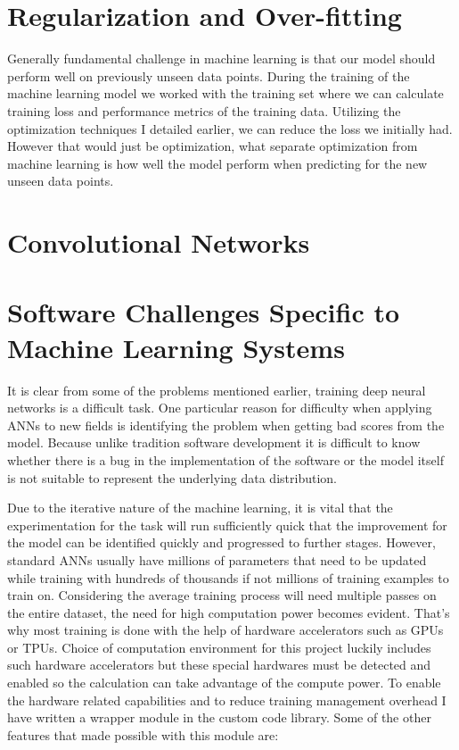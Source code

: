 \section{Regularization and Over-fitting} \label{sec:regularization}
Generally fundamental challenge in machine learning is that our model should perform well on previously unseen data points.
During the training of the machine learning model we worked with the training set where we can calculate training loss and performance metrics of the training data. 
Utilizing the optimization techniques I detailed earlier, we can reduce the loss we initially had. 
However that would just be optimization, what separate optimization from machine learning is how well the model perform when predicting for the new unseen data points. 


\section{Convolutional Networks} \label{sec:convnets}

\section{Software Challenges Specific to 
Machine Learning Systems} \label{sec:engchallenge}
It is clear from some of the problems mentioned earlier, training deep neural networks is a difficult task. 
One particular reason for difficulty when applying ANNs to new fields is identifying the problem when getting bad scores from the model. 
Because unlike tradition software development it is difficult to know whether there is a bug in the implementation of the software or the model itself is not suitable to represent the underlying data distribution.

Due to the iterative nature of the machine learning, it is vital that the experimentation for the task will run sufficiently quick that the improvement for the model can be identified quickly and progressed to further stages. 
However, standard ANNs usually have millions of parameters that need to be updated while training with hundreds of thousands if not millions of training examples to train on. 
Considering the average training process will need multiple passes on the entire dataset, the need for high computation power becomes evident.
That's why most training is done with the help of hardware accelerators such as GPUs or TPUs.
Choice of computation environment for this project luckily includes such hardware accelerators but these special hardwares must be detected and enabled so the calculation can take advantage of the compute power.
To enable the hardware related capabilities and to reduce training management overhead I have written a wrapper module in the custom code library.
Some of the other features that made possible with this module are:

